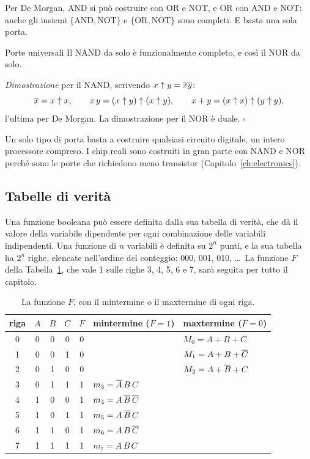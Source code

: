 Per De Morgan, AND si può costruire con OR e NOT, e OR con AND e NOT: anche gli
insiemi $\{\text{AND},\text{NOT}\}$ e $\{\text{OR},\text{NOT}\}$ sono
completi. E basta una sola porta.

\begin{theorem}{Porte universali}
Il NAND da solo è funzionalmente completo, e così il NOR da solo.
\end{theorem}

\noindent\emph{Dimostrazione} per il NAND, scrivendo $x\uparrow y=\overline{xy}$:
\[
\overline{x}=x\uparrow x,\qquad
x\,y=(x\uparrow y)\uparrow(x\uparrow y),\qquad
x+y=(x\uparrow x)\uparrow(y\uparrow y),
\]
l'ultima per De Morgan. La dimostrazione per il NOR è duale. \hfill$\square$

\smallskip
Un solo tipo di porta basta a costruire qualsiasi circuito digitale, un intero
processore compreso. I chip reali sono costruiti in gran parte con NAND e NOR
perché sono le porte che richiedono meno transistor
(Capitolo~\ref{ch:electronics}).

\subsection{Tabelle di verità}

Una funzione booleana può essere definita dalla sua tabella di verità, che dà
il valore della variabile dipendente per ogni combinazione delle variabili
indipendenti. Una funzione di $n$ variabili è definita su $2^{n}$ punti, e la
sua tabella ha $2^{n}$ righe, elencate nell'ordine del conteggio: 000, 001,
010, \ldots\ La funzione $F$ della Tabella~\ref{tab:b2:F}, che vale 1 sulle
righe 3, 4, 5, 6 e 7, sarà seguita per tutto il capitolo.

\begin{table}[htb]
\centering\small
\caption{La funzione $F$, con il mintermine o il maxtermine di ogni
riga.}\label{tab:b2:F}
\begin{tabular}{@{}cccc|cll@{}}
\toprule
riga & $A$ & $B$ & $C$ & $F$ & \textbf{mintermine ($F=1$)} & \textbf{maxtermine ($F=0$)}\\
\midrule
0 & 0&0&0 & 0 & & $M_0=A+B+C$\\
1 & 0&0&1 & 0 & & $M_1=A+B+\overline{C}$\\
2 & 0&1&0 & 0 & & $M_2=A+\overline{B}+C$\\
3 & 0&1&1 & 1 & $m_3=\overline{A}\,B\,C$ & \\
4 & 1&0&0 & 1 & $m_4=A\,\overline{B}\,\overline{C}$ & \\
5 & 1&0&1 & 1 & $m_5=A\,\overline{B}\,C$ & \\
6 & 1&1&0 & 1 & $m_6=A\,B\,\overline{C}$ & \\
7 & 1&1&1 & 1 & $m_7=A\,B\,C$ & \\
\bottomrule
\end{tabular}
\end{table}

